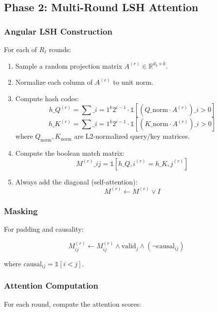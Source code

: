 \subsection{Phase 2: Multi-Round LSH Attention}

\subsubsection{Angular LSH Construction}

For each of $R_\ell$ rounds:

\begin{enumerate}
\item Sample a random projection matrix $A^{(r)} \in \mathbb{R}^{d_h \times k}$.
\item Normalize each column of $A^{(r)}$ to unit norm.
\item Compute hash codes:
  $$
  h\_Q^{(r)} = \sum\_{i=1}^{k} 2^{i-1} \cdot \mathbb{1}\left[\left(Q\_\text{norm} \cdot A^{(r)}\right)\_i > 0\right]
  \tag{4.14}
  $$
  $$
  h\_K^{(r)} = \sum\_{i=1}^{k} 2^{i-1} \cdot \mathbb{1}\left[\left(K\_\text{norm} \cdot A^{(r)}\right)\_i > 0\right]
  \tag{4.15}
  $$
  where $Q_\text{norm}, K_\text{norm}$ are L2-normalized query/key matrices.

\item Compute the boolean match matrix:
  $$
  M^{(r)}\_{ij} = \mathbb{1}[h\_{Q,i}^{(r)} = h\_{K,j}^{(r)}]
  \tag{4.16}
  $$

\item Always add the diagonal (self-attention):
  $$
  M^{(r)} \leftarrow M^{(r)} \lor I
  \tag{4.17}
  $$

\end{enumerate}
\subsubsection{Masking}

For padding and causality:

\[
M^{(r)}_{ij} \leftarrow M^{(r)}_{ij} \land \text{valid}_j \land (\neg \text{causal}_{ij})
\tag{4.18}
\]

where $\text{causal}_{ij} = \mathbb{1}[i < j]$.

\subsubsection{Attention Computation}

For each round, compute the attention scores:

